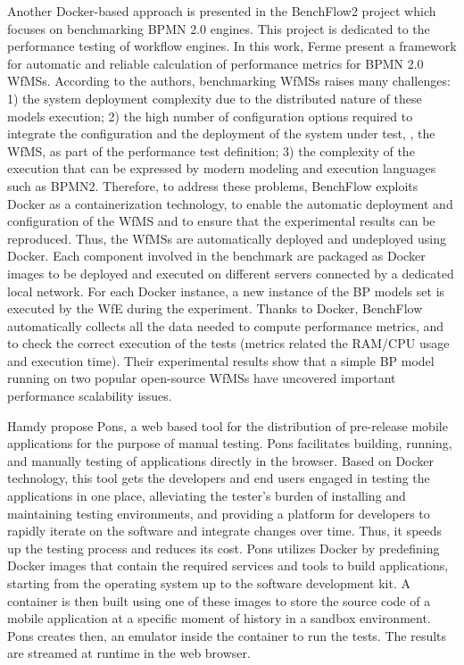 Another Docker-based approach is presented in the BenchFlow2 project which focuses on benchmarking BPMN 2.0 engines\cite{ferme2015framework}. This project is dedicated to the performance testing of workflow engines. In this work, Ferme \etal present a framework for automatic and reliable calculation of performance metrics for BPMN 2.0 WfMSs. 
According to the authors, benchmarking WfMSs raises many challenges: 1) the system deployment complexity due to the distributed nature of these models execution; 2) the high number of configuration options required to integrate the configuration and the deployment of the system under test, \ie, the WfMS, as part of the performance test definition; 3) the complexity of the execution  that can be expressed by modern modeling and execution languages such as BPMN2.
Therefore, to address these problems, BenchFlow exploits Docker as a containerization technology, to enable the automatic deployment and configuration of the WfMS and to ensure that the experimental results can be reproduced.
Thus, the WfMSs are automatically deployed and undeployed using Docker. Each component involved in the benchmark are packaged as Docker images
to be deployed and executed on different servers connected by a dedicated local
network. For each Docker instance, a new instance of the BP models set is executed by the WfE during the experiment.
Thanks to Docker, BenchFlow automatically collects all the data needed to compute performance metrics, and to check the correct execution of the tests (metrics related the RAM/CPU usage and execution time).
Their experimental results show that a simple BP model running on two popular
open-source WfMSs have uncovered important performance scalability issues. 

Hamdy \etal\cite{hamdy2016web} propose Pons, a web based tool for the distribution of pre-release mobile
applications for the purpose of manual testing. Pons facilitates building, running, and manually testing of  applications directly in the browser. 
Based on Docker technology, this tool gets the developers and end users engaged in testing the applications in one
place, alleviating the tester's burden of installing and maintaining testing environments, and providing a platform for developers to rapidly iterate on the software and integrate changes over time. Thus, it speeds up the testing process and reduces its cost.
Pons utilizes Docker by predefining Docker images that
contain the required services and tools to build 
applications, starting from the operating system up to the
software development kit. A container is then built using one of these images to store the source code of
a mobile application at a specific moment of history in a
sandbox environment. Pons creates then, an  emulator inside the  container to run the tests. The results are streamed at runtime in the web browser.

